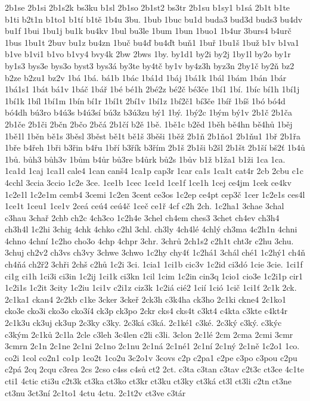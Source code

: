 2b1se
2b1si
2b1s2k
bs3ku
b1sl
2b1so
2b1st2
bs3tr
2b1su
b1sy1
b1sá
2b1t
b1te
b1ti
b2t1n
b1to1
b1tí
b1tě
1b4u
3bu.
1bub
1buc
bu1d
buda3
bud3d
buds3
bu4dv
bu1f
1bui
1bu1j
bu1k
bu4kv
1bul
bu3le
1bum
1bun
1buo1
1b4ur
3burs4
b4urč
1bus
1bu1t
2buv
bu1z
bu4zn
1buč
bu4ď
bu4ďt
buň1
1buř
1bu1š
1buž
b1v
b1va1
b1ve
b1vi1
b1vo
b1vy4
bvy4k
2bw
2bws
1by.
by1d1
by2i
by2j
1by1l
by2o
by1r
by1s3
bys3e
bys3o
byst3
bys3á
by3te
by4tč
by1v
by4z3h
byz3n
2by1č
by2ň
bz2
b2ze
b2zu1
bz2v
1bá
1bá.
bá1b
1bác
1bá1d
1báj
1bá1k
1bál
1bám
1bán
1bár
1bá1s1
1bát
bá1v
1báč
1bář
1bé
bé1h
2bé2z
bé2č
bé3če
1bí1
1bí.
1bíc
bí1h
1bí1j
1bí1k
1bíl
1bí1m
1bín
bí1r
1bí1t
2bí1v
1bí1z
1bí2č1
bí3če
1bíř
1bíš
1bó
bó4d
bó4dh
bú3ro
b4ú3s
b4ú3sí
bú3z
b3ú3zu
bý1
1bý.
1bý2c
1bým
bý1v
2b1č
2b1ča
2b1če
2b1či
2bčn
2bčo
2bčá
2b1čí
b2ě
1bě.
1bě1c
b2ěd
1běh
bě4hn
bě4hů
1běj
1bě1l
1běn
bě1s
3běsl
3běst
bě1t
bě1š
3běši
1běž
2b1ň
2b1ňo1
2b1ňu1
1bř
2b1řa
1bře
b4řeh
1bři
b3řin
b4řu
1bří
b3řík
b3řím
2b1š
2b1ši
b2šl
2b1št
2b1ší
bš2ť
1b4ů
1bů.
bůh3
bůh3v
1bům
b4ůr
bů3re
b4ůrk
bů2s
1bův
b1ž
b1ža1
b1ži
1ca
1ca.
1ca1d
1caj
1ca1l
cale4
1can
canš4
1ca1p
cap3r
1car
ca1s
1ca1t
cat4r
2cb
2cbu
c1c
4cchl
3ccia
3ccio
1c2e
3ce.
1ce1b
1cec
1ce1d
1ce1f
1ce1h
1cej
ce4jm
1cek
ce4kv
1c2e1l
1c2e1m
cemb4
3cemi
1c2en
3cent
ce3os
1c2ep
ce4pt
cep3č
1cer
1c2e1s
ces4l
1ce1t
1ceu1
1ce1v
2ceá
ceú4
ceú4č
1ceč
ce1ř
4cf
c2h
2ch.
1c2ha1
3chae
3chal
c3hau
3chař
2chb
ch2c
4ch3co
1c2h4e
3chel
ch4em
ches3
3chet
ch4ev
ch3h4
ch3h4l
1c2hi
3chig
4chk
4chko
c2hl
3chl.
ch3ly
4ch4lé
4chlý
ch3ma
4c2h1n
4chni
4chno
4chní
1c2ho
cho3o
4chp
4chpr
3chr.
3chrů
2ch1s2
c2h1t
cht3r
c2hu
3chu.
3chuj
ch2v2
ch3vs
ch3vy
3chwe
3chwo
1c2hy
chy4ť
1c2há1
3chál
ché1
1c2hý1
ch4ň
ch4ňá
ch2ř2
3chři
2chš
c2hů
1c2i
3ci.
1cia1
1ci1b
cic3v
1c2id
ci3dó
1cie
3cie.
1ci1f
ci1g
ci1h
1ci3i
ci3in
1c2ij
1ci1k
ci3kn
1cil
1cim
1c2in
cin3q
1cio1
cio3e
1c2i1p
cir1
1c2i1s
1c2it
3city
1c2iu
1ci1v
c2i1z
ciz3k
1c2iá
cié2
1cií
1ció
1cič
1ci1ť
2c1k
2ck.
2c1ka1
ckan4
2c2kb
c1ke
3cker
3ckeř
2ck3h
c3k4ha
ck3ho
2c1ki
ckne4
2c1ko1
cko3e
cko3i
cko3o
cko3í4
ck3p
ck3po
2ckr
cks4
cks4t
c3kt4
c4kta
c3kte
c4kt4r
2c1k3u
ck3uj
ck3up
2c3ky
c3ky.
2c3ká
c3ká.
2c1ké1
c3ké.
2c3ký
c3ký.
c3kýc
c3kým
2c1ků
2c1la
2cle
c3leh
3c4len
c2li
c3li.
3clon
2c1lé
2cm
2cma
2cmi
3cmr
3cmrn
2c1n
2c1ne
2c1ni
2c1no
2c1nu
2c1ná
2c1né1
2c1ní
2c1ný
2c1ně
1c2o1
1co.
co2i
1col
co2n1
co1p
1co2t
1co2u
3c2o1v
3covs
c2p
c2pa1
c2pe
c3po
c3pou
c2pu
c2pá
2cq
2cqu
c3rea
2cs
2cso
c4ss
c4sů
ct2
2ct.
c3ta
c3tan
c3tav
c2t3c
ct3ce
4c1te
cti1
4ctic
cti3u
c2t3k
ct3ka
ct3ko
ct3kr
ct3ku
ct3ky
ct3ká
ct3l
ct3li
c2tn
ct3ne
ct3nu
3ct3ní
2c1to1
4ctu
4ctu.
2c1t2v
ct3ve
c3tár
